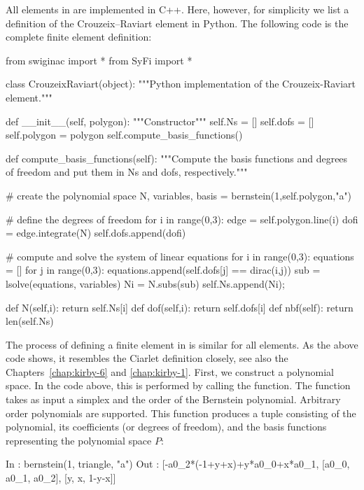 All elements in \syfi{} are implemented in C++. Here, however, for
simplicity we list a definition of the Crouzeix--Raviart element in Python.
The following code is the complete finite element definition:
\begin{python}
from swiginac import *
from SyFi import *

class CrouzeixRaviart(object):
    """Python implementation of the Crouzeix-Raviart element."""

    def __init__(self, polygon):
        """Constructor"""
        self.Ns = []
        self.dofs = []
        self.polygon = polygon
        self.compute_basis_functions()

    def compute_basis_functions(self):
        """Compute the basis functions and degrees of freedom
        and put them in Ns and dofs, respectively."""

        # create the polynomial space
        N, variables, basis = bernstein(1,self.polygon,"a")

        # define the degrees of freedom
        for i in range(0,3):
            edge = self.polygon.line(i)
            dofi = edge.integrate(N)
            self.dofs.append(dofi)

        # compute and solve the system of linear equations
        for i in range(0,3):
            equations = []
                for j in range(0,3):
                    equations.append(self.dofs[j] == dirac(i,j))
                    sub = lsolve(equations, variables)
                    Ni = N.subs(sub)
                    self.Ns.append(Ni);

    def N(self,i): return self.Ns[i]
    def dof(self,i): return self.dofs[i]
    def nbf(self): return len(self.Ns)
\end{python}
The process of defining a finite element in \syfi{} is similar for all
elements.  As the above code shows, it resembles the Ciarlet
definition closely, see also the Chapters~\ref{chap:kirby-6}
and \ref{chap:kirby-1}. First, we construct a polynomial space. In
the code above, this is performed by calling the 
function. The  function takes as input a simplex and
the order of the Bernstein polynomial. Arbitrary order polynomials are
supported. This function produces a tuple consisting of the
polynomial, its coefficients (or degrees of freedom), and the basis
functions representing the polynomial space $P$:
\begin{python}
In  : bernstein(1, triangle, "a")
Out : [-a0_2*(-1+y+x)+y*a0_0+x*a0_1, [a0_0, a0_1, a0_2], [y, x, 1-y-x]]
\end{python}
